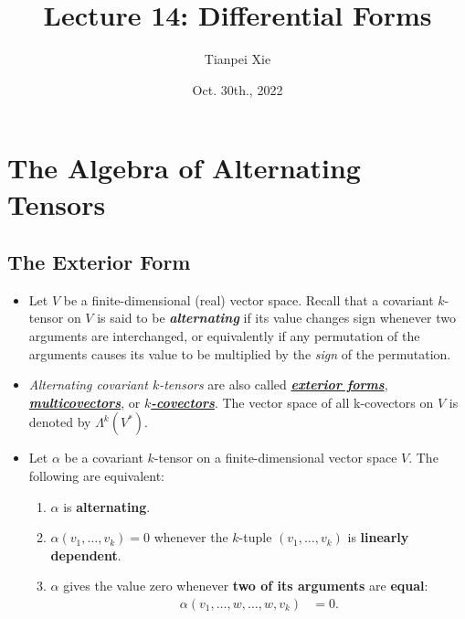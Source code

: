 \documentclass[11pt]{article}
\begin{document}
\title{Lecture 14: Differential Forms}
\author{ Tianpei Xie}
\date{Oct. 30th., 2022}
\maketitle
\tableofcontents
\newpage
\section{The Algebra of Alternating Tensors}
\subsection{The Exterior Form}
\begin{itemize}
\item \begin{remark}
Let $V$ be a finite-dimensional (real) vector space. Recall that a covariant $k$-tensor on $V$ is said to be \emph{\textbf{alternating}} if its value changes sign whenever two arguments are interchanged, or equivalently if any permutation of the arguments causes its value to be multiplied by the \emph{sign} of the permutation.
\end{remark}

\item \begin{definition}
\emph{Alternating covariant $k$-tensors} are also called \underline{\emph{\textbf{exterior forms}}}, \underline{\emph{\textbf{multicovectors}}}, or \underline{\emph{\textbf{$k$-covectors}}}. The vector space of all k-covectors on $V$ is denoted by $\Lambda^k(V^{*})$.
\end{definition}

\item \begin{lemma}
Let $\alpha$ be a covariant $k$-tensor on a finite-dimensional vector space $V$. The following are equivalent:
\begin{enumerate}
\item $\alpha$ is \textbf{alternating}.
\item $\alpha(v_1,\ldots, v_k) = 0$ whenever the $k$-tuple $(v_1,\ldots, v_k)$ is \textbf{linearly dependent}.
\item $\alpha$ gives the value zero whenever \textbf{two of its arguments} are \textbf{equal}:
\begin{align*}
\alpha(v_1, \ldots, w, \ldots, w, v_k) &= 0.
\end{align*}
\end{enumerate}
\end{lemma}


\end{itemize}
\end{document}
